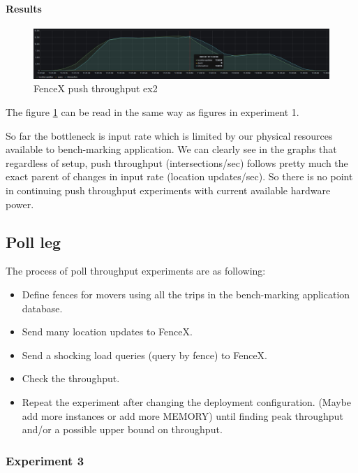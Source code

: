 \documentclass[a4]{report}
\begin{document}
        \paragraph{Results}
        \begin{figure}[ht]
            \caption{FenceX push throughput ex2}
            \label{fig:ex2}
            \includegraphics[scale=0.4]{images/evaluation/ex2-benchmarking(24,10).png}
        \end{figure}
        The figure \ref{fig:ex2} can be read in the same way as figures in experiment 1.

        So far the bottleneck is input rate which is limited by our physical resources available to bench-marking
        application.
        We can clearly see in the graphs that regardless of setup, push throughput (intersections/sec) follows pretty
        much the exact parent of changes in input rate (location updates/sec).
        So there is no point in continuing push throughput experiments with current available hardware power.

        \clearpage

        \subsection{Poll leg}
        The process of poll throughput experiments are as following:
        \begin{itemize}
            \item[1-] Define fences for movers using all the trips in the bench-marking application database.
            \item[2-] Send many location updates to FenceX.
            \item[2-] Send a shocking load queries (query by fence) to FenceX.
            \item[3-] Check the throughput.
            \item[4-] Repeat the experiment after changing the deployment configuration. (Maybe add more instances or add
            more MEMORY) until finding peak throughput and/or a possible upper bound on throughput.
        \end{itemize}

        \subsubsection{Experiment 3}
\end{document}
